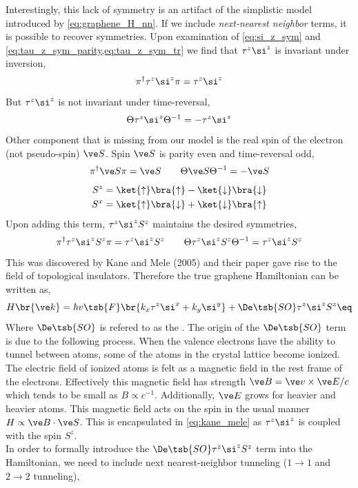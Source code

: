 \documentclass{article}
\begin{document}
Interestingly, this lack of symmetry is an artifact of the simplistic model introduced by \cref{eq:graphene_H_nn}. If we include \textit{next-nearest neighbor} terms, it is possible to recover symmetries. Upon examination of \cref{eq:si_z_sym} and \cref{eq:tau_z_sym_parity,eq:tau_z_sym_tr} we find that $\tau^{z} \si^{z}$ is invariant under inversion,
\[ \pi^{\dagger} \tau^{z} \si^{z} \pi = \tau^{z} \si^{z} \]
But $\tau^{z} \si^{z}$ is not invariant under time-reversal,
\[ \Theta \tau^{z} \si^{z} \Theta^{-1} = -\tau^{z} \si^{z} \]
Other component that is missing from our model is the real spin of the electron (not pseudo-spin) $\ve S$. Spin $\ve S$ is parity even and time-reversal odd,
\[ \pi^{\dagger} \ve S \pi = \ve S \qquad \Theta \ve S \Theta^{-1} = - \ve S \]
\begin{align*}
    S^{z} &= \ket{\uparrow} \bra{\uparrow} - \ket{\downarrow}\bra{\downarrow} \\
    S^{x} &= \ket{\uparrow} \bra{\downarrow} + \ket{\downarrow}\bra{\uparrow}
\end{align*}
Upon adding this term, $\tau^{z} \si^{z} S^{z}$ maintains the desired symmetries,
\[ \pi^{\dagger} \tau^{z} \si^{z} S^{z} \pi = \tau^{z} \si^{z} S^{z} \qquad \Theta \tau^{z} \si^{z} S^{z} \Theta^{-1} = \tau^{z} \si^{z} S^{z} \]
This was discovered by Kane and Mele (2005) and their paper gave rise to the field of topological insulators. Therefore the true graphene Hamiltonian can be written as,
\[ H\br{\ve k} =\hbar v\tsb{F} \br{k_x \tau^{z} \si^x + k_y \si^{y}} + \De\tsb{SO} \tau^{z} \si^{z} S^{z} \eq \label{eq:kane_mele}\]
Where $\De\tsb{SO}$ is refered to as the . The origin of the $\De\tsb{SO}$ term is due to the following process. When the valence electrons have the ability to tunnel between atoms, some of the atoms in the crystal lattice become ionized. The electric field of ionized atoms is felt as a magnetic field in the rest frame of the electrons. Effectively this magnetic field has strength $\ve B = \ve v \times \ve E / c$ which tends to be small as $B \propto c^{-1}$. Additionally, $\ve E$ grows for heavier and heavier atoms. This magnetic field acts on the spin in the usual manner $H \propto \ve B \cdot \ve S$. This is encapsulated in \cref{eq:kane_mele} as $\tau^{z} \si^{z}$ is coupled with the spin $S^{z}$. \\

In order to formally introduce the $\De\tsb{SO} \tau^{z} \si^{z} S^{z}$ term into the Hamiltonian, we need to include next nearest-neighbor tunneling ($1 \to 1$ and $2 \to 2$ tunneling),
\end{document}
